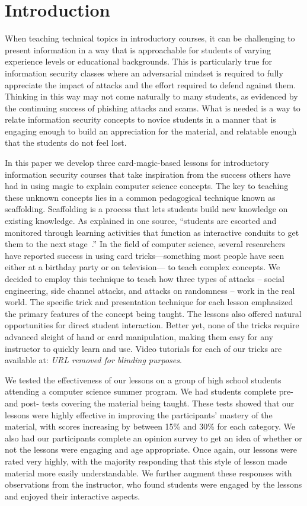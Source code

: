 \section{Introduction}
\label{SEC:introduction}

When teaching technical topics
in introductory courses,
it can be challenging
to present information
in a way that is approachable
for students of varying
experience levels
or educational backgrounds.
This is particularly true
for information security classes
where an adversarial mindset
is required
to fully appreciate the impact of attacks and the effort required to
defend against them.
Thinking in this way
may not come naturally
to many students,
as evidenced
by the continuing success of phishing attacks
and scams.
What is needed
is a way
to relate information security concepts
to novice students
in a manner
that is engaging enough
to build an appreciation for the material,
and relatable enough that the students do not feel lost.

In this paper
we develop three card-magic-based lessons
for introductory information security courses
that take inspiration
from the success others have had
in using magic
to explain computer science concepts.
The key to teaching these unknown concepts
lies in a common pedagogical technique
known as scaffolding.
Scaffolding is a process that lets students build
new knowledge on existing knowledge.
As explained in one source,
``students are escorted and monitored through learning
activities that function as interactive conduits to get
them to the next stage~\cite{raymond2000}.''
In the field of computer science,
several researchers have reported success in using card
tricks—something most people
have seen either at a birthday party
or on television— to teach complex concepts.
We decided to employ this technique to teach how three types
of attacks -- social engineering, side channel attacks, and attacks on
randomness -- work in the real world.
The specific trick and presentation technique
for each lesson emphasized the primary
features of the concept being taught.
The lessons also offered natural opportunities
for direct student interaction.
Better yet, none of the tricks require advanced sleight of hand
or card manipulation,
making them easy for any instructor to quickly learn and use.
Video tutorials for each of our tricks are available at: \textit{URL removed
for blinding purposes}.


We tested the effectiveness of our lessons on
a group of high school students
attending a computer science summer program.
We had students complete pre- and post- tests covering the
material being taught.  These tests showed that our lessons were highly
effective in improving the participants' mastery of the material,
with scores
increasing by between 15\% and 30\% for each category.
We also had our participants complete an opinion survey to get an idea of
whether or not the lessons were engaging and age appropriate.  Once again, our
lessons were rated very highly,
with the majority responding that this style of lesson made material
more easily understandable.
We further augment these responses
with observations
from the instructor,
who found students were engaged by the lessons and enjoyed their interactive
aspects.


